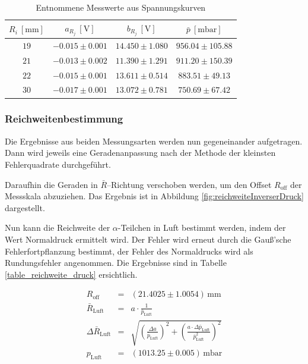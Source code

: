 \documentclass[12pt,a4paper]{scrartcl}
\numberwithin{equation}{section} %
\begin{document}
\begin{table}[H]
	\centering
	\begin{tabular}{||c|c|c|c||}
		\hline
		$R_i\ [\mathrm{mm}]$
			& $a_{R_j}\ [\mathrm{V}]$
			& $b_{R_j}\ [\mathrm{V}]$
			& $\bar{p}\ [\mathrm{mbar}]$ \\
		\hline \hline
		$19$
			& $-0.015 \pm 0.001$
			& $14.450 \pm 1.080$
			& $956.04 \pm 105.88$ \\
		\hline
		$21$
			& $-0.013 \pm 0.002$
			& $11.390 \pm 1.291$
			& $911.20 \pm 150.39$ \\
		\hline
		$22$
			& $-0.015 \pm 0.001$
			& $13.611 \pm 0.514$
			& $883.51 \pm 49.13$ \\
		\hline
		$30$
			& $-0.017 \pm 0.001$
			& $13.072 \pm 0.781$
			& $750.69 \pm 67.42$ \\
		\hline
	\end{tabular}
	\caption{Entnommene Messwerte aus Spannungskurven}
	\label{table_messwerte_spannung}
\end{table}

\hypertarget{Reichweite-Ergebnisse}{%
	\subsubsection{Reichweitenbestimmung}\label{Reichweite-Ergebnisse}}

Die Ergebnisse aus beiden Messungsarten werden nun gegeneinander aufgetragen. Dann wird jeweils eine Geradenanpassung nach der Methode der kleinsten Fehlerquadrate durchgeführt.

Daraufhin die Geraden in $\bar R$--Richtung verschoben werden, um den Offset $R_\mathrm{off}$ der Messskala abzuziehen. Das Ergebnis ist in Abbildung \ref{fig:reichweiteInverserDruck} dargestellt.

Nun kann die Reichweite der $\alpha$-Teilchen in Luft bestimmt werden, indem der Wert Normaldruck ermittelt wird. Der Fehler wird erneut durch die Gauß'sche Fehlerfortpflanzung bestimmt, der Fehler des Normaldrucks wird als Rundungsfehler angenommen. Die Ergebnisse sind in Tabelle \ref{table_reichweite_druck} ersichtlich.

\begin{eqnarray}
	R_\mathrm{off} &=& (21.4025 \pm 1.0054) \mathrm{\,mm} \\
	\bar{R}_\mathrm{Luft} &=& a \cdot \frac{1}{\bar{p}_\mathrm{Luft}} \\
	\Delta \bar{R}_\mathrm{Luft} &=& \sqrt{\left(\frac{\Delta a}{\bar{p}_\mathrm{Luft}}\right)^2 + \left(\frac{a \cdot \Delta \bar{p}_\mathrm{Luft}}{\bar{p}_\mathrm{Luft}^2}\right)^2} \\
	p_\mathrm{Luft} &=&(1013.25 \pm 0.005) \mathrm{\, mbar}
\end{eqnarray}
\end{document}
